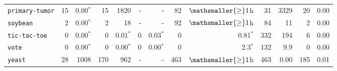 \begin{tabular}{lrrrrrrrrrrrr}
\texttt{primary-tumor} & 15 & 0.00$^*$ & 15 & 1820 & - & - & 82 & $\mathsmaller{\geq}1$h & 31 & 3329 & 20 & 0.00\\
\texttt{soybean} & 2 & 0.00$^*$ & 2 & 18 & - & - & 92 & $\mathsmaller{\geq}1$h & 84 & 11 & 2 & 0.00\\
\texttt{tic-tac-toe} & 0 & 0.00$^*$ & 0 & 0.01$^*$ & 0 & 0.03$^*$ & 0 & 0.81$^*$ & 332 & 194 & 6 & 0.00\\
\texttt{vote} & 0 & 0.00$^*$ & 0 & 0.00$^*$ & 0 & 0.00$^*$ & 0 & 2.3$^*$ & 132 & 9.9 & 0 & 0.00\\
\texttt{yeast} & 28 & 1008 & 170 & 962 & - & - & 463 & $\mathsmaller{\geq}1$h & 463 & 0.00 & 185 & 0.01\\
\bottomrule
\end{tabular}
